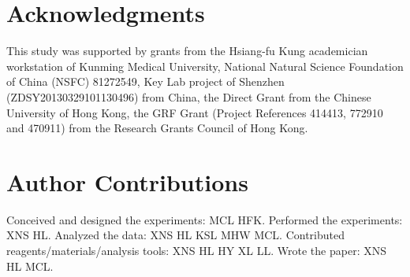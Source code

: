 \documentclass[10pt,letterpaper]{article}
\begin{document}
\section*{Acknowledgments}

This study was supported by grants from the Hsiang-fu Kung academician workstation of Kunming Medical University, National Natural Science Foundation of China (NSFC) 81272549, Key Lab project of Shenzhen (ZDSY20130329101130496) from China, the Direct Grant from the Chinese University of Hong Kong, the GRF Grant (Project References 414413, 772910 and 470911) from the Research Grants Council of Hong Kong.

\section*{Author Contributions}

Conceived and designed the experiments: MCL HFK. Performed the experiments: XNS HL. Analyzed the data: XNS HL KSL MHW MCL. Contributed reagents/materials/analysis tools: XNS HL HY XL LL. Wrote the paper: XNS HL MCL.

\nolinenumbers

%
%
% 




\end{document}
